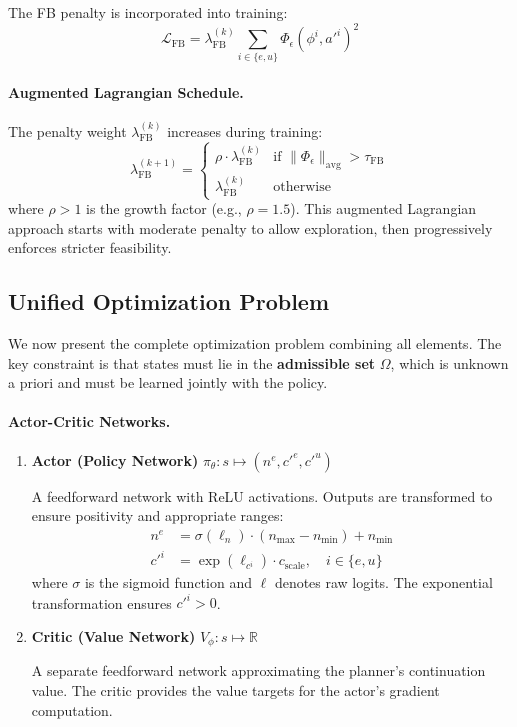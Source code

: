 The FB penalty is incorporated into training:
\begin{equation}\label{eq:fb_penalty}
    \mathcal{L}_{\text{FB}} = \lambda_{\text{FB}}^{(k)} \sum_{i \in \{e, u\}} \Phi_\epsilon(\phi^i, a'^i)^2
\end{equation}

\paragraph{Augmented Lagrangian Schedule.}
The penalty weight $\lambda_{\text{FB}}^{(k)}$ increases during training:
\begin{equation}
    \lambda_{\text{FB}}^{(k+1)} = \begin{cases}
        \rho \cdot \lambda_{\text{FB}}^{(k)} & \text{if } \|\Phi_\epsilon\|_{\text{avg}} > \tau_{\text{FB}} \\
        \lambda_{\text{FB}}^{(k)} & \text{otherwise}
    \end{cases}
\end{equation}
where $\rho > 1$ is the growth factor (e.g., $\rho = 1.5$). This augmented Lagrangian approach starts with moderate penalty to allow exploration, then progressively enforces stricter feasibility.


\subsection{Unified Optimization Problem}

We now present the complete optimization problem combining all elements. The key constraint is that states must lie in the \textbf{admissible set} $\Omega$, which is unknown a priori and must be learned jointly with the policy.

\paragraph{Actor-Critic Networks.}
\begin{enumerate}
    \item \textbf{Actor (Policy Network)} $\pi_\theta: s \mapsto (n^e, c'^e, c'^u)$
    
    A feedforward network with ReLU activations. Outputs are transformed to ensure positivity and appropriate ranges:
    \begin{align}
        n^e &= \sigma(\ell_n) \cdot (n_{\max} - n_{\min}) + n_{\min} \\
        c'^i &= \exp(\ell_{c^i}) \cdot c_{\text{scale}}, \quad i \in \{e, u\}
    \end{align}
    where $\sigma$ is the sigmoid function and $\ell$ denotes raw logits. The exponential transformation ensures $c'^i > 0$.
    
    \item \textbf{Critic (Value Network)} $V_\phi: s \mapsto \mathbb{R}$
    
    A separate feedforward network approximating the planner's continuation value. The critic provides the value targets for the actor's gradient computation.
\end{enumerate}

